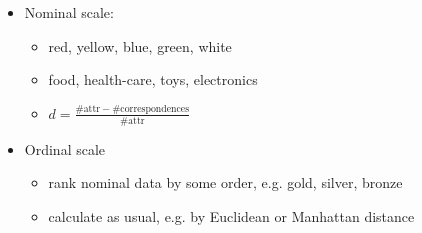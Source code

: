 \begin{breakbox}

\begin{itemize}
	\item Nominal scale:
		\begin{itemize}
			\item red, yellow, blue, green, white
			\item food, health-care, toys, electronics
			\item $d=\frac{\# \text{attr} - \# \text{correspondences}}{\# \text{attr}}$			
		\end{itemize}
	\item Ordinal scale
		\begin{itemize}
			\item rank nominal data by some order, e.g. gold, silver, bronze
			\item calculate as usual, e.g. by Euclidean or Manhattan distance
		\end{itemize}
\end{itemize}
\end{breakbox}



%



